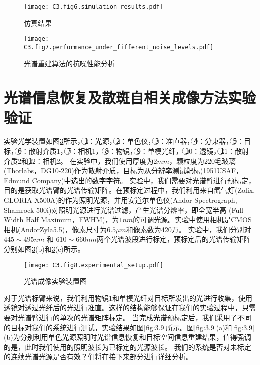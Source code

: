\begin{figure}[htp]
	\centering
	\texttt{[image: C3.fig6.simulation\_results.pdf]}
	\caption{仿真结果}
	\label{fig:3.6}
\end{figure}

\begin{figure}[htp]
	\centering
	\texttt{[image: C3.fig7.performance\_under\_fifferent\_noise\_levels.pdf]}
	\caption{光谱重建算法的抗噪性能分析}
	\label{fig:3.7}
\end{figure}

\section{光谱信息恢复及散斑自相关成像方法实验验证}

实验光学装置如图\ref{fig:3.8}所示，{\large \textcircled{\normalsize 1}}：光源，{\large \textcircled{\normalsize 2}}：单色仪，{\large \textcircled{\normalsize 3}}：准直器，{\large \textcircled{\normalsize 4}}：分束器，{\large \textcircled{\normalsize 5}}：目标，{\large \textcircled{\normalsize 6}}：散射介质1，{\large \textcircled{\normalsize 7}}：相机1，
{\large \textcircled{\normalsize 8}}：物镜，{\large \textcircled{\normalsize 9}}：单模光纤，
{\large \textcircled{\normalsize 10}}：透镜，{\large \textcircled{\normalsize 11}}：散射介质2和{\large \textcircled{\normalsize 12}}：相机2。
在实验中，我们使用厚度为$2mm$，颗粒度为$220$毛玻璃(Thorlabs，DG10-220)作为散射介质，目标为从分辨率测试靶标(1951USAF，Edmund Company)中选出的数字字符。
实验中，我们需要对光谱臂进行预标定，目的是获取光谱臂的光谱传输矩阵。在预标定过程中，我们利用来自氙气灯(Zolix, GLORIA-X500A)的作为照明光源，并用安道尔单色仪(Andor Spectrograph, Shamrock 500i)对照明光源进行光谱过滤，产生光谱分辨率，即全宽半高
(Full Width Half Maximum，FWHM)，为$1 nm$的可调光源。实验中使用相机是CMOS相机(AndorZyla5.5)，像素尺寸为$6.5\mu m$和像素数为420万。
实验中，我们分别对$445 \sim 495nm$ 和 $610 \sim 660nm$两个光谱波段进行标定，预标定后的光谱传输矩阵分别如图\ref{fig:3.8}(b)和\ref{fig:3.8}(c)所示。

\begin{figure}[htp]
	\centering
	\texttt{[image: C3.fig8.experimental\_setup.pdf]}
	\caption{光谱成像实验装置图}
	\label{fig:3.8}
\end{figure}

对于光谱标臂来说，我们利用物镜1和单模光纤对目标所发出的光进行收集，使用透镜对透过光纤后的光进行准直。这样的结构能够保证在我们的实验过程中，只需要对光谱臂进行的单次的光谱矩阵标定。
当完成光谱预标定后，我们采用了不同的目标对我们的系统进行测试，实验结果如图\ref{fig:3.9}所示。图\ref{fig:3.9}(a)和\ref{fig:3.9}(b)为分别利用单色光源照明时光谱信息恢复和目标空间信息重建结果，值得强调的是，此时我们使用的照明波长为已标定的光源波长。
我们的系统是否对未标定的连续光谱光源是否有效？们将在接下来部分进行详细分析。

